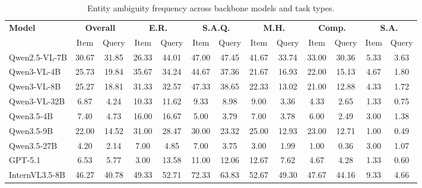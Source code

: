 \documentclass{article} %
\begin{document}
\begin{table}[htbp]
\centering
\setlength{\tabcolsep}{3pt}
\caption{Entity ambiguity frequency across backbone models and task types.}
\begin{tabular}{l c c c c c c c c c c c c}
\toprule
\multirow{2}{*}{\textbf{Model}} & 
\multicolumn{2}{c}{\textbf{Overall}} &
\multicolumn{2}{c}{\textbf{E.R.}} &
\multicolumn{2}{c}{\textbf{S.A.Q.}} &
\multicolumn{2}{c}{\textbf{M.H.}} &
\multicolumn{2}{c}{\textbf{Comp.}} &
\multicolumn{2}{c}{\textbf{S.A.}} \\
\cmidrule(lr){2-3} \cmidrule(lr){4-5} \cmidrule(lr){6-7} \cmidrule(lr){8-9} \cmidrule(lr){10-11} \cmidrule(lr){12-13}
 & Item  & Query  & Item  & Query  & Item  & Query  & Item  & Query  & Item  & Query  & Item  & Query  \\
\midrule
Qwen2.5-VL-7B & 30.67 & 31.85 & 26.33 & 44.01 & 47.00 & 47.45 & 41.67 & 33.74 & 33.00 & 30.36 & 5.33 & 3.63 \\
Qwen3-VL-4B & 25.73 & 19.84 & 35.67 & 34.24 & 44.67 & 37.36 & 21.67 & 16.93 & 22.00 & 15.13 & 4.67 & 1.80 \\
Qwen3-VL-8B & 25.27 & 18.81 & 31.33 & 32.57 & 47.33 & 38.65 & 22.33 & 13.02 & 21.00 & 12.88 & 4.33 & 1.72 \\
Qwen3-VL-32B & 6.87 & 4.24 & 10.33 & 11.62 & 9.33 & 8.98 & 9.00 & 3.36 & 4.33 & 2.65 & 1.33 & 0.75 \\
Qwen3.5-4B & 7.40 & 4.73 & 16.00 & 16.67 & 5.00 & 3.79 & 7.00 & 3.78 & 6.00 & 2.49 & 3.00 & 1.38 \\
Qwen3.5-9B & 22.00 & 14.52 & 31.00 & 28.47 & 30.00 & 23.32 & 25.00 & 12.93 & 23.00 & 12.71 & 1.00 & 0.49 \\
Qwen3.5-27B & 4.20 & 2.14 & 7.00 & 4.85 & 7.00 & 3.75 & 3.00 & 1.99 & 1.00 & 0.36 & 3.00 & 1.07 \\
GPT-5.1 & 6.53 & 5.77 & 3.00 & 13.58 & 11.00 & 12.06 & 12.67 & 7.62 & 4.67 & 4.28 & 1.33 & 0.60 \\
InternVL3.5-8B & 46.27 & 40.78 & 49.33 & 52.71 & 72.33 & 63.83 & 52.67 & 49.30 & 47.67 & 44.16 & 9.33 & 4.66 \\
\bottomrule
\end{tabular}
\label{tab:ambiguity_frequency_task_type}
\end{table}
\end{document}
